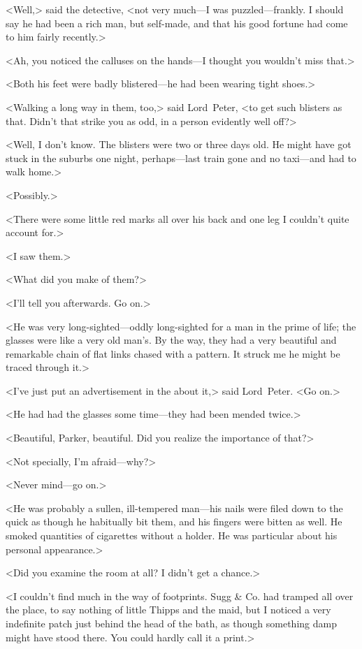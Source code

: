 <Well,> said the detective, <not very much—I was puzzled—frankly. I should say he had been a rich man, but self-made, and that his good fortune had come to him fairly recently.>

<Ah, you noticed the calluses on the hands—I thought you wouldn't miss that.>

<Both his feet were badly blistered—he had been wearing tight shoes.>

<Walking a long way in them, too,> said Lord~Peter, <to get such blisters as that. Didn't that strike you as odd, in a person evidently well off?>

<Well, I don't know. The blisters were two or three days old. He might have got stuck in the suburbs one night, perhaps—last train gone and no taxi—and had to walk home.>

<Possibly.>

<There were some little red marks all over his back and one leg I couldn't quite account for.>

<I saw them.>

<What did you make of them?>

<I'll tell you afterwards. Go on.>

<He was very long-sighted—oddly long-sighted for a man in the prime of life; the glasses were like a very old man's. By the way, they had a very beautiful and remarkable chain of flat links chased with a pattern. It struck me he might be traced through it.>

<I've just put an advertisement in the  about it,> said Lord~Peter. <Go on.>

<He had had the glasses some time—they had been mended twice.>

<Beautiful, Parker, beautiful. Did you realize the importance of that?>

<Not specially, I'm afraid—why?>

<Never mind—go on.>

<He was probably a sullen, ill-tempered man—his nails were filed down to the quick as though he habitually bit them, and his fingers were bitten as well. He smoked quantities of cigarettes without a holder. He was particular about his personal appearance.>

<Did you examine the room at all? I didn't get a chance.>

<I couldn't find much in the way of footprints. Sugg \& Co. had tramped all over the place, to say nothing of little Thipps and the maid, but I noticed a very indefinite patch just behind the head of the bath, as though something damp might have stood there. You could hardly call it a print.>

